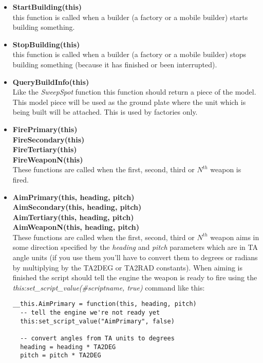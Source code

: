 \documentclass[a4paper,10pt]{article}
\begin{document}
\begin{itemize}
 \item \textbf{StartBuilding(this)}\\
  this function is called when a builder (a factory or a mobile builder) starts building something.

 \item \textbf{StopBuilding(this)}\\
  this function is called when a builder (a factory or a mobile builder) stops building something (because it has finished or been interrupted).

 \item \textbf{QueryBuildInfo(this)}\\
  Like the \emph{SweepSpot} function this function should return a piece of the model. This model piece will be used as the ground plate where the unit which is being built will be attached. This is used by factories only.

 \item \textbf{FirePrimary(this)}\\
       \textbf{FireSecondary(this)}\\
       \textbf{FireTertiary(this)}\\
       \textbf{FireWeaponN(this)}\\
  These functions are called when the first, second, third or $N^{th}$ weapon is fired.

 \item \textbf{AimPrimary(this, heading, pitch)}\\
       \textbf{AimSecondary(this, heading, pitch)}\\
       \textbf{AimTertiary(this, heading, pitch)}\\
       \textbf{AimWeaponN(this, heading, pitch)}\\
  These functions are called when the first, second, third or $N^{th}$ weapon aims in some direction specified by the \emph{heading} and \emph{pitch} parameters which are in TA angle units (if you use them you'll have to convert them to degrees or radians by multiplying by the TA2DEG or TA2RAD constants). When aiming is finished the script should tell the engine the weapon is ready to fire using the \emph{this:set\_script\_value(\#scriptname, true)} command like this:
\begin{lstlisting}
__this.AimPrimary = function(this, heading, pitch)
  -- tell the engine we're not ready yet
  this:set_script_value("AimPrimary", false)

  -- convert angles from TA units to degrees
  heading = heading * TA2DEG
  pitch = pitch * TA2DEG


\end{lstlisting}
\end{itemize}
\end{document}
